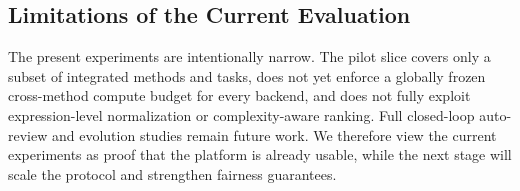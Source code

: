 \subsection{Limitations of the Current Evaluation}

The present experiments are intentionally narrow. The pilot slice covers only a subset of integrated methods and tasks, does not yet enforce a globally frozen cross-method compute budget for every backend, and does not fully exploit expression-level normalization or complexity-aware ranking. Full closed-loop auto-review and evolution studies remain future work. We therefore view the current experiments as proof that the platform is already usable, while the next stage will scale the protocol and strengthen fairness guarantees.
